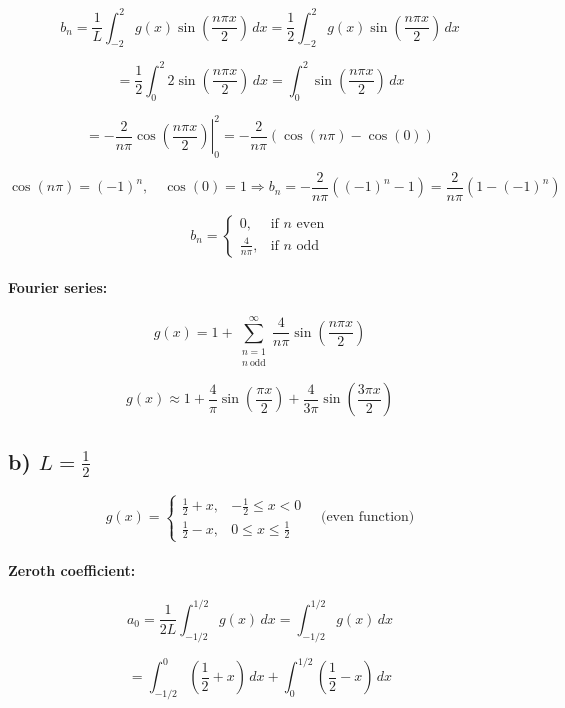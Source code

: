 \documentclass{article}
\begin{document}
\[
b_n = \frac{1}{L} \int_{-2}^{2} g(x) \sin\left( \frac{n\pi x}{2} \right)\,dx
= \frac{1}{2} \int_{-2}^{2} g(x) \sin\left( \frac{n\pi x}{2} \right)\,dx
\]

\[
= \frac{1}{2} \int_0^2 2 \sin\left( \frac{n\pi x}{2} \right)\,dx
= \int_0^2 \sin\left( \frac{n\pi x}{2} \right)\,dx
\]

\[
= \left. -\frac{2}{n\pi} \cos\left( \frac{n\pi x}{2} \right) \right|_0^2
= -\frac{2}{n\pi} \left( \cos(n\pi) - \cos(0) \right)
\]

\[
\cos(n\pi) = (-1)^n, \quad \cos(0) = 1
\Rightarrow b_n = -\frac{2}{n\pi} \left( (-1)^n - 1 \right)
= \frac{2}{n\pi} \left( 1 - (-1)^n \right)
\]

\[
b_n =
\begin{cases}
0, & \text{if } n \text{ even} \\
\frac{4}{n\pi}, & \text{if } n \text{ odd}
\end{cases}
\]

\paragraph{Fourier series:}

\[
g(x) = 1 + \sum_{\substack{n=1 \\ n\ \text{odd}}}^\infty \frac{4}{n\pi} \sin\left( \frac{n\pi x}{2} \right)
\]

\[
g(x) \approx 1 + \frac{4}{\pi} \sin\left( \frac{\pi x}{2} \right) + \frac{4}{3\pi} \sin\left( \frac{3\pi x}{2} \right)
\]

\subsection*{b) $L = \frac{1}{2}$}

\[
g(x) =
\begin{cases}
\frac{1}{2} + x, & -\frac{1}{2} \le x < 0 \\
\frac{1}{2} - x, & 0 \le x \le \frac{1}{2}
\end{cases}
\quad \text{(even function)}
\]

\paragraph{Zeroth coefficient:}

\[
a_0 = \frac{1}{2L} \int_{-1/2}^{1/2} g(x)\,dx = \int_{-1/2}^{1/2} g(x)\,dx
\]

\[
= \int_{-1/2}^{0} \left( \frac{1}{2} + x \right)\,dx + \int_0^{1/2} \left( \frac{1}{2} - x \right)\,dx
\]
\end{document}
